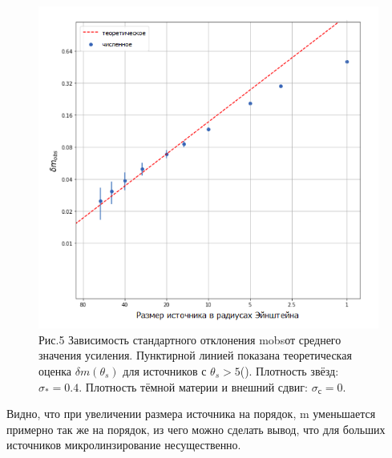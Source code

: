 \begin{figure}[H]
    \centering
	\includegraphics[scale=0.75]{pics/size_np_std.png}
	\caption{ Рис.5 Зависимость стандартного отклонения mobsот среднего значения усиления. Пунктирной линией показана теоретическая оценка $\delta m (\theta_s)$ для источников с $\theta_s > 5$(\cite{refsdalstabell1991}). Плотность звёзд: $\sigma_*=0.4$. Плотность тёмной материи и внешний сдвиг: $\sigma_с=0$.  } 
\end{figure}
Видно, что при увеличении размера источника на порядок, m уменьшается примерно так же на порядок, из чего можно сделать вывод, что для больших источников микролинзирование несущественно.